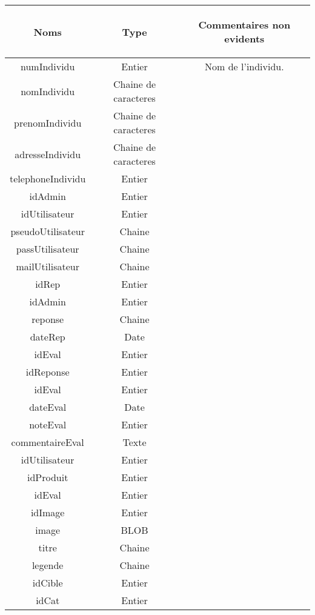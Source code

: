 \begin{tabular}{|c|c|c|}
\hline
	\begin{bf}Noms\end{bf} & 
	\begin{bf}Type \end{bf} & 
	\begin{bf}Commentaires non evidents\end{bf}\\
\hline
	numIndividu & Entier & Nom de l'individu.\\
\hline
	nomIndividu & Chaine de caracteres & \\
\hline
	prenomIndividu & Chaine de caracteres & \\
\hline
	adresseIndividu & Chaine de caracteres & \\
\hline
	telephoneIndividu & Entier & \\
\hline
	idAdmin & Entier & \\
\hline
	idUtilisateur & Entier & \\
\hline
	pseudoUtilisateur & Chaine & \\
\hline
	passUtilisateur & Chaine & \\
\hline
	mailUtilisateur & Chaine & \\
\hline
	idRep & Entier & \\
\hline
	idAdmin & Entier & \\
\hline
	reponse & Chaine & \\
\hline
	dateRep & Date & \\
\hline
	idEval & Entier & \\
\hline
	idReponse & Entier & \\
\hline
	idEval & Entier & \\
\hline
	dateEval & Date & \\
\hline
	noteEval & Entier & \\
\hline
	commentaireEval & Texte & \\
\hline
	idUtilisateur & Entier & \\
\hline
	idProduit & Entier & \\
\hline
	idEval & Entier & \\
\hline
	idImage & Entier & \\
\hline
	image & BLOB & \\
\hline
	titre & Chaine & \\
\hline
	legende & Chaine & \\
\hline
	idCible & Entier & \\
\hline
	idCat & Entier & \\

\end{tabular}
